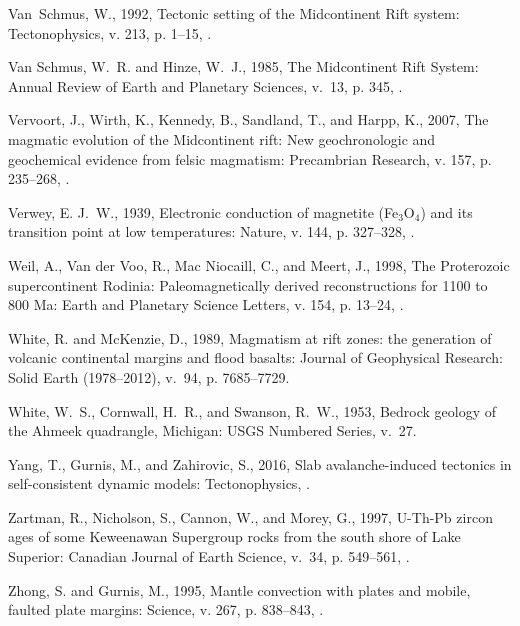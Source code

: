 \documentclass[11pt,letterpaper]{article}
\begin{document}
\begin{thebibliography}{153}
Van~Schmus, W., 1992, {Tectonic setting of the Midcontinent Rift system}:
  Tectonophysics, v. 213, p. 1--15, .

{Van Schmus}, W.~R. and {Hinze}, W.~J., 1985, {The Midcontinent Rift System}:
  Annual Review of Earth and Planetary Sciences, v.~13, p. 345,
  .

Vervoort, J., Wirth, K., Kennedy, B., Sandland, T., and Harpp, K., 2007, The
  magmatic evolution of the {M}idcontinent rift: New geochronologic and
  geochemical evidence from felsic magmatism: Precambrian Research, v. 157, p.
  235--268, .

Verwey, E. J.~W., 1939, Electronic conduction of magnetite ({F}e$_3${O}$_4$)
  and its transition point at low temperatures: Nature, v. 144, p. 327--328,
  .

Weil, A., {Van der Voo}, R., {Mac Niocaill}, C., and Meert, J., 1998, The
  {P}roterozoic supercontinent {R}odinia: {P}aleomagnetically derived
  reconstructions for 1100 to 800 {M}a: Earth and Planetary Science Letters, v.
  154, p. 13--24, .

White, R. and McKenzie, D., 1989, Magmatism at rift zones: the generation of
  volcanic continental margins and flood basalts: Journal of Geophysical
  Research: Solid Earth (1978--2012), v.~94, p. 7685--7729.

White, W.~S., Cornwall, H.~R., and Swanson, R.~W., 1953, Bedrock geology of the
  {A}hmeek quadrangle, {M}ichigan: USGS Numbered Series, v.~27.

Yang, T., Gurnis, M., and Zahirovic, S., 2016, Slab avalanche-induced tectonics
  in self-consistent dynamic models: Tectonophysics,
  .

Zartman, R., Nicholson, S., Cannon, W., and Morey, G., 1997, {U-Th-Pb} zircon
  ages of some {K}eweenawan {S}upergroup rocks from the south shore of {L}ake
  {S}uperior: Canadian Journal of Earth Science, v.~34, p. 549--561,
  .

Zhong, S. and Gurnis, M., 1995, Mantle convection with plates and mobile,
  faulted plate margins: Science, v. 267, p. 838--843,
  .

\end{thebibliography}
\end{document}
